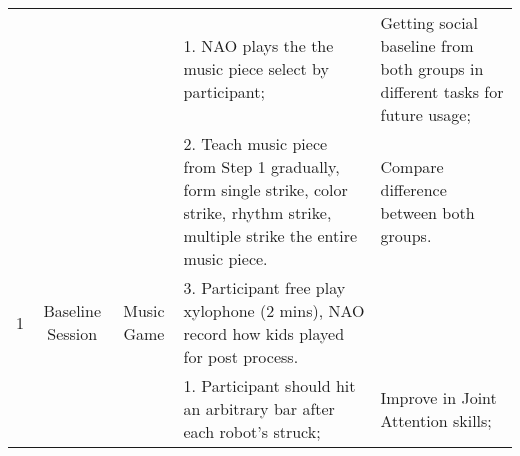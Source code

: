 \begin{sidewaystable}[tbp]
\begin{center}
{\begin{tabular}{cccll}
	{\color[HTML]{666666} }                    & {\color[HTML]{666666} }                                          & {\color[HTML]{666666} }                                                                                                                               & {\color[HTML]{666666} 1. NAO plays the   the music piece select by participant;}                                                                                                     & {\color[HTML]{666666} Getting social   baseline from both groups in different tasks for future usage;}                                                                 \\
	{\color[HTML]{666666} }                    & {\color[HTML]{666666} }                                          & {\color[HTML]{666666} }                                                                                                                               & {\color[HTML]{666666} 2. Teach music piece from   Step 1 gradually, form single strike, color strike, rhythm strike, multiple   strike the entire music piece.}                      & {\color[HTML]{666666} Compare difference between both groups.}                                                                                                         \\
	\multirow{-6}{*}{{\color[HTML]{666666} 1}} & \multirow{-6}{*}{{\color[HTML]{666666} Baseline   Session}}      & \multirow{-3}{*}{{\color[HTML]{666666} Music Game}}                                                                                                   & {\color[HTML]{666666} 3. Participant free play   xylophone (2 mins), NAO record how kids played for post process.}                                                                   &                                                                                                                                                                        \\
	{\color[HTML]{666666} }                    & {\color[HTML]{666666} }                                          & {\color[HTML]{666666} }                                                                                                                               & {\color[HTML]{666666} 1. Participant   should hit an arbitrary bar after each robot’s struck;}                                                                                       & {\color[HTML]{666666} Improve in Joint   Attention skills;}                                                                                                            \\

\end{tabular}}
\end{center}
\end{sidewaystable}
